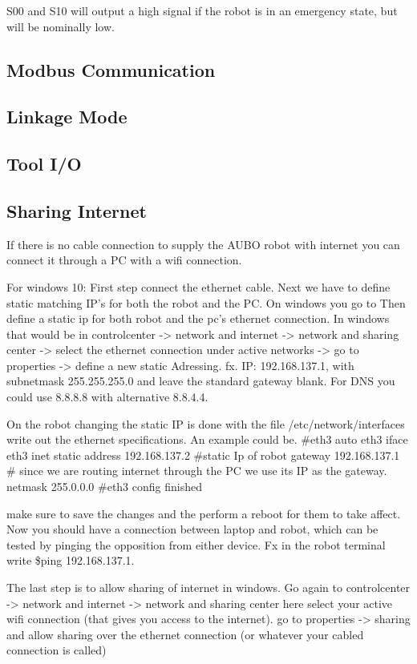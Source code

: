 \documentclass{article}
\begin{document}
S00 and S10 will output a high signal if the robot is in an emergency state, but will be nominally low. 



\subsection{Modbus Communication}
\subsection{Linkage Mode}
\subsection{Tool I/O}
\subsection{Sharing Internet}
If there is no cable connection to supply the AUBO robot with internet you can connect it through a PC with a wifi connection. 

For windows 10: 
First step connect the ethernet cable.
Next we have to define static matching IP's for both the robot and the PC. 
On windows you go to 
Then define a static ip for both robot and the pc's ethernet connection. 
In windows that would be in controlcenter -> network and internet -> network and sharing center -> select the ethernet connection under active networks -> go to properties -> define a new static Adressing. fx. IP: 192.168.137.1, with subnetmask 255.255.255.0 and leave the standard gateway blank. For DNS you could use 8.8.8.8 with alternative 8.8.4.4. 

On the robot changing the static IP is done with the file /etc/network/interfaces
write out the ethernet specifications. An example could be. 
#eth3
auto eth3 
iface eth3 inet static 
address 192.168.137.2 #static Ip of robot
gateway 192.168.137.1 # since we are routing internet through the PC we use its IP as the gateway. 
netmask 255.0.0.0  
#eth3 config finished

make sure to save the changes and the perform a reboot for them to take affect. 
Now you should have a connection between laptop and robot, which can be tested by pinging the opposition from either device. Fx in the robot terminal write \$ping 192.168.137.1.
 
The last step is to allow sharing of internet in windows. Go again to controlcenter -> network and internet -> network and sharing center here select your active wifi connection (that gives you access to the internet). go to properties -> sharing and allow sharing over the ethernet connection (or whatever your cabled connection is called)
\end{document}
